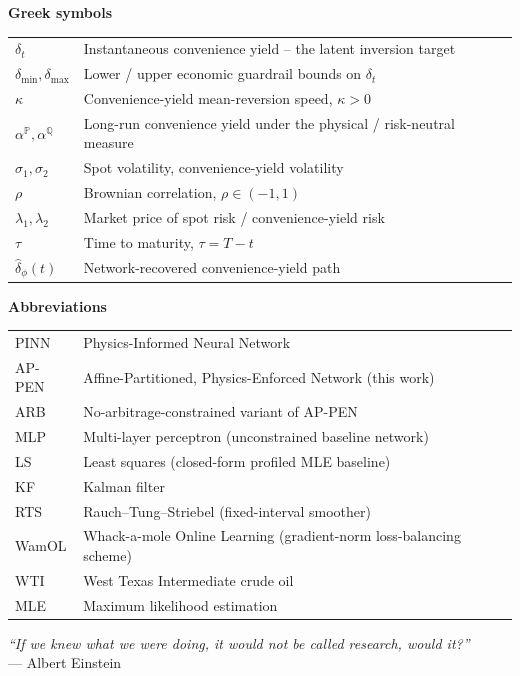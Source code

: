 \documentclass[11pt, a4paper]{article}
\begin{document}
\vspace{0.4cm}
\noindent\textbf{Greek symbols}
\begin{tabular}{@{}p{2.2cm}p{13.5cm}@{}}
$\delta_t$ & Instantaneous convenience yield -- the latent inversion target \\
$\delta_{\min}, \delta_{\max}$ & Lower / upper economic guardrail bounds on $\delta_t$ \\
$\kappa$ & Convenience-yield mean-reversion speed, $\kappa > 0$ \\
$\alpha^{\mathbb{P}}, \alpha^{\mathbb{Q}}$ & Long-run convenience yield under the physical / risk-neutral measure \\
$\sigma_1, \sigma_2$ & Spot volatility, convenience-yield volatility \\
$\rho$ & Brownian correlation, $\rho \in (-1,1)$ \\
$\lambda_1, \lambda_2$ & Market price of spot risk / convenience-yield risk \\
$\tau$ & Time to maturity, $\tau = T - t$ \\
$\hat\delta_\phi(t)$ & Network-recovered convenience-yield path \\
\end{tabular}

\vspace{0.4cm}
\noindent\textbf{Abbreviations}
\begin{tabular}{@{}p{2.2cm}p{13.5cm}@{}}
PINN & Physics-Informed Neural Network \\
AP-PEN & Affine-Partitioned, Physics-Enforced Network (this work) \\
ARB & No-arbitrage-constrained variant of AP-PEN \\
MLP & Multi-layer perceptron (unconstrained baseline network) \\
LS & Least squares (closed-form profiled MLE baseline) \\
KF & Kalman filter \\
RTS & Rauch--Tung--Striebel (fixed-interval smoother) \\
WamOL & Whack-a-mole Online Learning (gradient-norm loss-balancing scheme) \\
WTI & West Texas Intermediate crude oil \\
MLE & Maximum likelihood estimation \\
\end{tabular}

\vspace{1cm}
\begin{center}
\textit{``If we knew what we were doing, it would not be called research, would it?''}\\[2pt]
--- Albert Einstein
\end{center}
\end{document}
